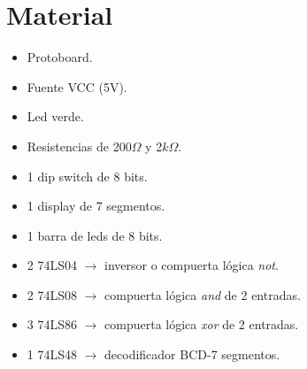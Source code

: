 \documentclass[12pt, oneside, openany]{article}
\begin{document}
\section{Material}
{\sffamily\Large
    \renewcommand{\labelitemi}{$\bullet$}
    \begin{itemize}
        \item Protoboard.
        \item Fuente VCC (5V).
        \item Led verde.
        \item Resistencias de 200$\Omega$ y 2$k\Omega$.
        \item 1 dip switch de 8 bits.
        \item 1 display de 7 segmentos.
        \item 1 barra de leds de 8 bits.
        \item 2 74LS04 $\to$ inversor o compuerta lógica \emph{not}.
        \item 2 74LS08 $\to$ compuerta lógica \emph{and} de 2 entradas.
        \item 3 74LS86 $\to$ compuerta lógica \emph{xor} de 2 entradas.
        \item 1 74LS48 $\to$ decodificador BCD-7 segmentos.
    \end{itemize}
    
}

\newpage
\end{document}
